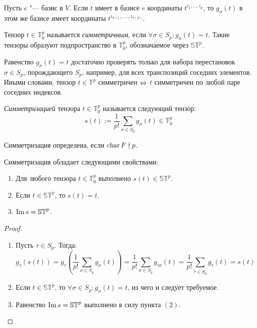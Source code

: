 \begin{note}
	Пусть $e$ "--- базис в $V$. Если $t$ имеет в базисе $e$ координаты $t^{i_1, \dots, i_p}$, то $g_\sigma(t)$ в этом же базисе имеет координаты $t^{i_{\sigma(1)}, \dots, i_{\sigma(p)}}$.
\end{note}

\begin{definition}
	Тензор $t \in \mathbb{T}^p_0$ называется \textit{симметричным}, если $\forall \sigma \in S_p: g_\sigma(t) = t$. Такие тензоры образуют подпространство в $\mathbb{T}^p_0$, обозначаемое через $\mathbb{ST}^p$.
\end{definition}

\begin{note}
	Равенство $g_\sigma(t) = t$ достаточно проверять только для набора перестановок $\sigma \in S_p$, порождающего $S_p$, например, для всех транспозиций соседних элементов. Иными словами, тензор $t \in \mathbb{T}^p$ симметричен $\hm{\Leftrightarrow}$ $t$ симметричен по любой паре соседних индексов.
\end{note}

\begin{definition}
	\textit{Симметризацией} тензора $t \in \mathbb{T}^p_0$ называется следующий тензор:
	\[s(t) := \frac1{p!}\sum_{\sigma \in S_p}g_\sigma(t) \in \mathbb{T}^p_0\]
	
	Симметризация определена, если $\operatorname{char}{F} \nmid p$.
\end{definition}

\begin{proposition} Симметризация обладает следующими свойствами:
	\begin{enumerate}
		\item Для любого тензора $t \in \mathbb{T}^p_0$ выполнено $s(t) \in \mathbb{ST}^p$.
		\item Если $t \in \mathbb{ST}^p$, то $s(t) = t$.
		\item $\operatorname{Im}{s} = \mathbb{ST}^p$.
	\end{enumerate}
\end{proposition}

\begin{proof}~
	\begin{enumerate}
		\item Пусть $\tau \in S_p$. Тогда:
		\[g_\tau(s(t)) = g_\tau\left(\frac1{p!}\sum_{\sigma \in S_p}g_\sigma(t)\right) = \frac1{p!}\sum_{\sigma \in S_p} g_{\tau\sigma}(t) = \frac1{p!}\sum_{\widetilde\tau \in S_p} g_{\widetilde\tau}(t) = s(t)\]
		
		\item Если $t \in \mathbb{ST}^p$, то $\forall \sigma \in S_p: g_\sigma(t) = t$, из чего и следует требуемое.
		
		\item Равенство $\operatorname{Im}{s} = \mathbb{ST}^p$ выполнено в силу пункта $(2)$.\qedhere
	\end{enumerate}
\end{proof}

